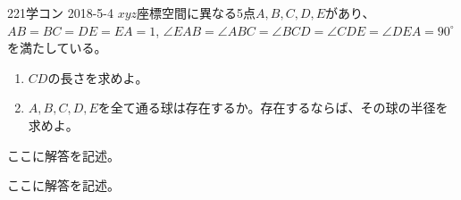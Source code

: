 \begin{prob}{221}{}{学コン 2018-5-4}
 $xyz$座標空間に異なる5点$A, B, C, D, E$があり、$AB=BC=DE=EA=1$, $\angle{EAB}=\angle{ABC}=\angle{BCD}=\angle{CDE}=\angle{DEA}=90^\circ$ を満たしている。
 \begin{enumerate}
  \item $CD$の長さを求めよ。
  \item $A, B, C, D, E$を全て通る球は存在するか。存在するならば、その球の半径を求めよ。
 \end{enumerate}
\end{prob}

ここに解答を記述。

ここに解答を記述。